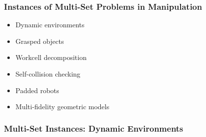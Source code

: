 \documentclass[serif]{beamer}
\def\gridopacity{100}
\begin{document}
\begin{frame}
   \frametitle{Instances of Multi-Set Problems in Manipulation}
   \begin{itemize}
   \item Dynamic environments
   \item Grasped objects
   \item Workcell decomposition
   \item Self-collision checking
   \item Padded robots
   \item Multi-fidelity geometric models
   \end{itemize}
\end{frame}

\begin{frame}
   \frametitle{Multi-Set Instances: Dynamic Environments}
\end{frame}
\end{document}
